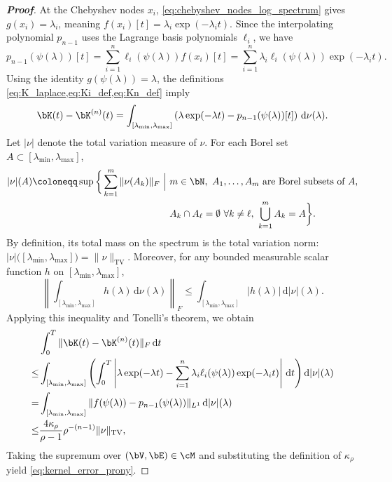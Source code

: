 \begin{proof}[\bf Proof]
At the Chebyshev nodes $x_i$, \cref{eq:chebyshev_nodes_log_spectrum} gives $g(x_i) = \lambda_i$, meaning $f(x_i)[t] = \lambda_i\exp(-\lambda_i t)$. Since the interpolating polynomial $p_{n-1}$ uses the Lagrange basis polynomials $\ell_i$, we have
\begin{equation*}
p_{n-1}(\psi(\lambda))[t]
=
\sum_{i=1}^n \ell_i(\psi(\lambda))f(x_i)[t]
=
\sum_{i=1}^n \lambda_i\ell_i(\psi(\lambda))\exp(-\lambda_i t).
\end{equation*}
Using the identity $g(\psi(\lambda)) = \lambda$, the definitions \cref{eq:K_laplace,eq:Ki_def,eq:Kn_def} imply
\begin{equation*}
\bK(t)-\bK^{(n)}(t)
=
\int_{[\lambda_{\min},\lambda_{\max}]}
\left(
\lambda\exp(-\lambda t) - p_{n-1}(\psi(\lambda))[t]
\right)
\,\mathrm d\nu(\lambda).
\end{equation*}
Let $|\nu|$ denote the total variation measure of $\nu$. For each Borel set $A\subset[\lambda_{\min},\lambda_{\max}]$,
\begin{equation*}
\begin{aligned}
|\nu|(A)
\coloneqq
\sup\bigg\{\sum_{k=1}^{m}\|\nu(A_k)\|_F\ \Big\vert\ &m\in\bN,\ A_1,\dots,A_m\ \text{are Borel subsets of }A,\\
&A_k\cap A_\ell=\emptyset\ \forall k\ne \ell,\ \bigcup_{k=1}^{m}A_k=A\bigg\}.
\end{aligned}
\end{equation*}
By definition, its total mass on the spectrum is the total variation norm: $|\nu|\bigl([\lambda_{\min},\lambda_{\max}]\bigr) = \|\nu\|_{\mathrm{TV}}$. 
Moreover, for any bounded measurable scalar function $h$ on $[\lambda_{\min},\lambda_{\max}]$,
\begin{equation*}
    \left\|\int_{[\lambda_{\min},\lambda_{\max}]} h(\lambda)\,\mathrm{d}\nu(\lambda)\right\|_F
\le \int_{[\lambda_{\min},\lambda_{\max}]} |h(\lambda)|\,\mathrm{d}|\nu|(\lambda).
\end{equation*}
Applying this inequality and Tonelli's theorem, we obtain
\begin{align}
&\int_0^T \|\bK(t)-\bK^{(n)}(t)\|_F\,\mathrm{d}t \nonumber\\
\leq &
\int_{[\lambda_{\min},\lambda_{\max}]}
\left(
\int_0^T
\left|\lambda\exp(-\lambda t)-\sum_{i=1}^n \lambda_i\ell_i(\psi(\lambda))\exp(-\lambda_i t)\right|
\,\mathrm dt
\right)\mathrm d|\nu|(\lambda)\nonumber\\
=&
\int_{[\lambda_{\min},\lambda_{\max}]}
\|f(\psi(\lambda))-p_{n-1}(\psi(\lambda))\|_{L^1}\,\mathrm d|\nu|(\lambda)
\nonumber\\
\leq &
\frac{4\kappa_{\rho}}{\rho-1}\rho^{-(n-1)}\|\nu\|_{\mathrm{TV}},
\label{eq:kernel_error_prony_pointwise}
\end{align}
Taking the supremum over $(\bV,\bE)\in\cM$ and substituting the definition of $\kappa_{\rho}$ yield \cref{eq:kernel_error_prony}.
\end{proof}


